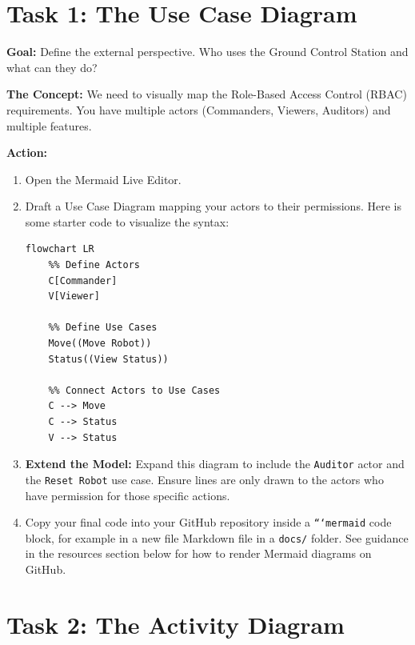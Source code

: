 \documentclass[a4paper,12pt]{article}
\begin{document}

\section*{Task 1: The Use Case Diagram}

\textbf{Goal:} Define the external perspective. Who uses the Ground Control Station and what can they do?

\textbf{The Concept:} We need to visually map the Role-Based Access Control (RBAC) requirements. You have multiple actors (Commanders, Viewers, Auditors) and multiple features. 

\vspace{0.3cm}
\textbf{Action:}
\begin{enumerate}
    \item Open the Mermaid Live Editor.
    \item Draft a Use Case Diagram mapping your actors to their permissions. Here is some starter code to visualize the syntax:
    \begin{verbatim}
flowchart LR
    %% Define Actors
    C[Commander]
    V[Viewer]

    %% Define Use Cases
    Move((Move Robot))
    Status((View Status))

    %% Connect Actors to Use Cases
    C --> Move
    C --> Status
    V --> Status
    \end{verbatim}
    \item \textbf{Extend the Model:} Expand this diagram to include the \texttt{Auditor} actor and the \texttt{Reset Robot} use case. Ensure lines are only drawn to the actors who have permission for those specific actions.
    \item Copy your final code into your GitHub repository inside a \texttt{```mermaid} code block, for example in a new file Markdown file in a \texttt{docs/} folder. See guidance in the resources section below for how to render Mermaid diagrams on GitHub.
\end{enumerate}


\section*{Task 2: The Activity Diagram}
\end{document}

